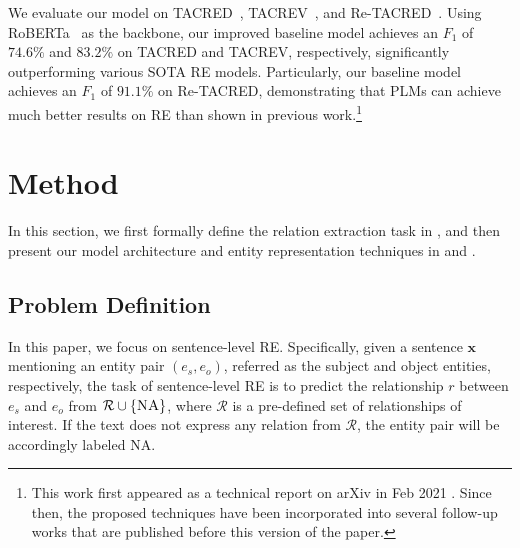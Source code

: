 \documentclass[11pt,a4paper]{article}
\begin{document}
We evaluate our model on TACRED~\cite{zhang-etal-2017-position}, TACREV~\cite{alt-etal-2020-tacred}, and Re-TACRED~\cite{stoica2021re}.
Using RoBERTa~\cite{liu2019roberta} as the backbone, our improved baseline model achieves an $F_1$ of $74.6\%$ and $83.2\%$ on TACRED and TACREV, respectively, significantly outperforming various SOTA RE models.
Particularly, our baseline model achieves an $F_1$ of $91.1\%$ on Re-TACRED, demonstrating that PLMs can achieve much better results on RE than shown in previous work.\footnote{This work first appeared as a technical report on arXiv in Feb 2021 \cite{zhou2021improved}.
Since then, the proposed techniques have been incorporated into several follow-up works \cite{chen2022knowprompt,wang-etal-2022-rely,wang-etal-2022-graphcache,lu2022summarization,han2021ptr,kulkarni-etal-2022-learning} that are published before this version of the paper.
}


\section{Method}

In this section, we first formally define the relation extraction task in , and then present our model architecture and entity representation techniques in  and .

\subsection{Problem Definition}
\label{sec:task_definition}
In this paper, we focus on sentence-level RE.
Specifically, given a sentence $\bm{x}$ mentioning an entity pair $(e_s, e_o)$, referred as the subject and object entities, respectively, the task of sentence-level RE is to predict the relationship $r$ between $e_s$ and $e_o$ from $\mathcal{R} \cup \{\textsc{NA}\}$, where $\mathcal{R}$ is a pre-defined set of relationships of interest.
If the text does not express any relation from $\mathcal{R}$, the entity pair will be accordingly labeled \textsc{NA}.
\end{document}

